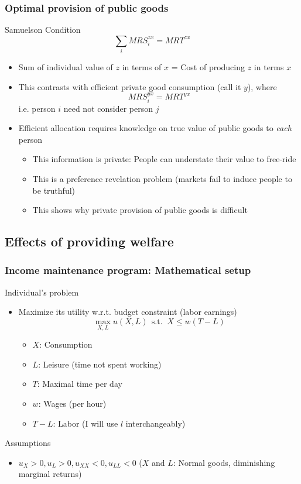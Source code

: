 \documentclass[aspectratio=169]{beamer}
\begin{document}
\begin{frame}
\frametitle{Optimal provision of public goods} 
Samuelson Condition
    \[
    \sum_i MRS_i^{zx} = MRT^{zx}
    \]
\begin{itemize}\setlength\itemsep{3pt}
    \item Sum of individual value of $z$ in terms of $x$  = Cost of producing $z$ in terms $x$
    \item This contrasts with efficient private good consumption (call it $y$), where
    \[ MRS_i^{yx} = MRT^{yx} \]
    i.e. person $i$ need not consider person $j$
    \item Efficient allocation requires knowledge on true value of public goods to \textit{each} person
    \begin{itemize}\setlength\itemsep{3pt}
      \item This information is private: People can understate their value to free-ride
      \item This is a preference revelation problem (markets fail to induce people to be truthful) 
      \item This shows why private provision of public goods is difficult
    \end{itemize}
\end{itemize}
\end{frame}



\subsection{Effects of providing welfare}
\begin{frame}
\frametitle{Income maintenance program: Mathematical setup}
Individual's problem
\begin{itemize}\setlength\itemsep{3pt}
\item Maximize its utility w.r.t. budget constraint (labor earnings)
\[
\max_{X,L} u(X,L) \ \ \text{s.t. } \ X \leq w(T-L)
\]\vspace{-10pt}
\begin{itemize}
  \item $X$: Consumption 
  \item $L$: Leisure (time not spent working)
  \item $T$: Maximal time per day
  \item $w$: Wages (per hour)
  \item $T-L$: Labor (I will use $l$ interchangeably) 
\end{itemize}
\end{itemize} \medskip
Assumptions
\begin{itemize}
  \item $u_X>0, u_L>0, u_{XX}<0, u_{LL}<0$ ($X$ and $L$: Normal goods, diminishing marginal returns)
\end{itemize}
\end{frame}
\end{document}
